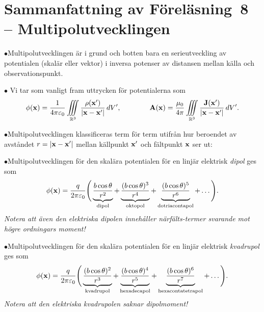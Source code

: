 \section{Sammanfattning av F{\"o}rel{\"a}sning~8 -- Multipolutvecklingen}
\item{$\bullet$}{Multipolutvecklingen {\"a}r i grund och botten bara en
  serieutveckling av potentialen (skal{\"a}r eller vektor) i inversa
  potenser av distansen mellan k{\"a}lla och observationspunkt.}
\item{$\bullet$}{
  Vi tar som vanligt fram uttrycken f{\"o}r potentialerna som
  $$
    \phi({\bf x})={{1}\over{4\pi\varepsilon_0}}
      \iiint_{{\Bbb R}^3}{{\rho({\bf x}')}\over{|{\bf x}-{\bf x}'|}}\,dV',
      \qquad\qquad
    {\bf A}({\bf x})={{\mu_0}\over{4\pi}}
      \iiint_{{\Bbb R}^3}{{{\bf J}({\bf x}')}\over{|{\bf x}-{\bf x}'|}}\,dV'.
  $$}
\item{$\bullet$}{Multipolutvecklingen klassificeras term f{\"o}r term
  utifr{\aa}n hur beroendet av avst{\aa}ndet $r=|{\bf x}-{\bf x}'|$ mellan
  k{\"a}llpunkt ${\bf x}'$ och f{\"a}ltpunkt ${\bf x}$ ser ut:
  }
\item{$\bullet$}{Multipolutvecklingen f{\"o}r den skal{\"a}ra potentialen
  f{\"o}r en linj{\"a}r elektrisk {\it dipol} ges som
  $$
    \phi({\bf x})
       ={{q}\over{2\pi\varepsilon_0}}\Bigg(
         \underbrace{{{b\cos\theta}\over{r^2}}}_{\rm dipol}
         +\underbrace{{{(b\cos\theta)^3}\over{r^4}}}_{\rm oktopol}
         +\underbrace{{{(b\cos\theta)^5}\over{r^6}}}_{\rm dotriacontapol}
         +\ldots
        \Bigg).
  $$
  {\it Notera att {\"a}ven den elektriska dipolen inneh{\aa}ller
  n{\"a}rf{\"a}lts-termer svarande mot h{\"o}gre ordningars moment!}}
\item{$\bullet$}{Multipolutvecklingen f{\"o}r den skal{\"a}ra potentialen
  f{\"o}r en linj{\"a}r elektrisk {\it kvadrupol} ges som
  $$
    \phi({\bf x})
      ={{q}\over{2\pi\varepsilon_0}}\Bigg(
         \underbrace{{{(b\cos\theta)^2}\over{r^3}}}_{\rm kvadrupol}
         +\underbrace{{{(b\cos\theta)^4}\over{r^5}}}_{\rm hexadecapol}
         +\underbrace{{{(b\cos\theta)^6}\over{r^7}}}_{\rm hexacontatetrapol}
         +\ldots
        \Bigg).
  $$
  {\it Notera att den elektriska kvadrupolen saknar dipolmoment!}}
